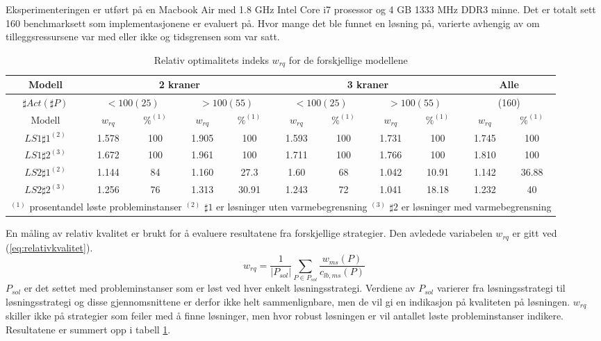 Eksperimenteringen er utført på en Macbook Air med 1.8 GHz Intel Core i7 prosessor og 4 GB 1333 MHz DDR3 minne. Det er totalt sett 160 benchmarksett som implementasjonene er evaluert på. Hvor mange det ble funnet en løsning på, varierte avhengig av om tilleggsressursene var med eller ikke og tidsgrensen som var satt.

\begin{table}[h]
\caption{Relativ optimalitets indeks $w_{rq}$ for de forskjellige modellene}
\begin{center}
\begin{tabular}{ | c | c | c | c | c | c | c | c | c | c | c | }
\hline
\textbf{Modell} & \multicolumn{4}{|c|}{\textbf{2 kraner}} & \multicolumn{4}{|c|}{\textbf{3 kraner}} & \multicolumn{2}{|c|}{\textbf{Alle}} \\ \hline
$\sharp Act(\sharp P)$ & \multicolumn{2}{|c|}{$< 100 (25)$} & \multicolumn{2}{|c|}{$> 100 (55)$} & \multicolumn{2}{|c|}{$< 100 (25)$} & \multicolumn{2}{|c|}{$> 100 (55)$} & \multicolumn{2}{|c|}{(160)} \\ 
\hline
Modell & $w_{rq}$ & $\%^{(1)}$ & $w_{rq}$ & $\%^{(1)}$  & $w_{rq}$ & $\%^{(1)}$ & $w_{rq}$ & $\%^{(1)}$ & $w_{rq}$ & $\%^{(1)}$ \\ \hline
$LS1 \sharp 1^{(2)}$ & 1.578 & 100 & 1.905 & 100 & 1.593 & 100 & 1.731 & 100 & 1.745 & 100 \\
$LS1 \sharp 2^{(3)}$ & 1.672 & 100 & 1.961 & 100 & 1.711 & 100 & 1.766 & 100 & 1.810 & 100 \\
$LS2 \sharp 1^{(2)}$ & 1.144 & 84 & 1.160 & 27.3 & 1.60 & 68 & 1.042 & 10.91 & 1.142 & 36.88 \\
$LS2 \sharp 2^{(3)}$ & 1.256 & 76 & 1.313 & 30.91 & 1.243 & 72 & 1.041 & 18.18 & 1.232 & 40 \\
\hline
\multicolumn{11}{l}{\begin{minipage}{6in}$^{(1)}$ prosentandel løste probleminstanser
$^{(2)}$ $\sharp 1$ er løsninger uten varmebegrensning
$^{(3)}$ $\sharp 2$ er løsninger med varmebegrensning \end{minipage}}
\end{tabular}
\end{center}
\label{tab:resultaterSum}
\end{table}

En måling av relativ kvalitet er brukt for å evaluere resultatene fra forskjellige strategier. Den avledede variabelen $w_{rq}$ er gitt ved (\ref{eq:relativkvalitet}).
\begin{equation}
w_{rq} = \frac{1}{| P_{sol} |} \sum_{P \in P_{sol}} \frac{w_{ms}(P)}{c_{lb,ms}(P)}
\label{eq:relativkvalitet}
\end{equation}
$P_{sol}$ er det settet med probleminstanser som er løst ved hver enkelt løsningsstrategi. Verdiene av $P_{sol}$ varierer fra løsningsstrategi til løsningsstrategi og disse gjennomsnittene er derfor ikke helt sammenlignbare, men de vil gi en indikasjon på kvaliteten på løsningen. $w_{rq}$ skiller ikke på strategier som feiler med å finne løsninger, men hvor robust løsningen er vil antallet løste probleminstanser indikere. Resultatene er summert opp i tabell \ref{tab:resultaterSum}.

